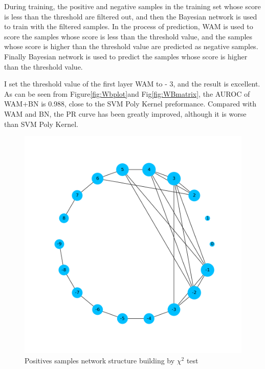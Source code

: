 \documentclass{gapd}
\begin{document}
During training, the positive and negative samples in the training set
whose score is less than the threshold are filtered out, and then the
Bayesian network is used to train with the filtered samples. In the
process of prediction, WAM is used to score the samples whose score is
less than the threshold value, and the samples whose score is higher
than the threshold value are predicted as negative samples. Finally
Bayesian network is used to predict the samples whose score is higher
than the threshold value.

I set the threshold value of the first layer WAM to - 3, and the result
is excellent. As can be seen from Figure\ref{fig:Wbplot}and Fig\ref{fig:WBmatrix}, the AUROC of WAM+BN
is 0.988, close to the SVM Poly Kernel preformance. Compared with WAM
and BN, the PR curve has been greatly improved, although it is worse
than SVM Poly Kernel.

\begin{figure}
  \centering
  \includegraphics[width=0.85\columnwidth]{assets/image-20210624165031819.png}
  \caption{Positives samples network structure building by \(\chi^2\) test}
  \label{fig:positive}
\end{figure}
  
\end{document}
